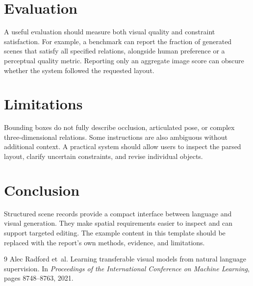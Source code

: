 \documentclass[10pt,a4paper,twoside]{article}
\makeatletter
\newcommand{\ReportAuthors}{First Author\textsuperscript{1,*}, Second Author\textsuperscript{1,2,\ensuremath{\dagger}}, Third Author\textsuperscript{2}}
\newcommand{\ReportLabName}{ReLER Lab}
\newcommand{\ReportInstitution}{\ReportLabName, Zhejiang University}
\newcommand{\ReportAuthorNotes}{\textsuperscript{*}Equal contribution \quad \textsuperscript{\ensuremath{\dagger}}Corresponding author}
\newcommand{\ReportContact}{Second Author at \href{mailto:author@example.edu}{author@example.edu}}
\newif\ifbackauthorlist
\makeatother
\begin{document}
\section{Evaluation}

A useful evaluation should measure both visual quality and constraint
satisfaction. For example, a benchmark can report the fraction of generated
scenes that satisfy all specified relations, alongside human preference or a
perceptual quality metric. Reporting only an aggregate image score can obscure
whether the system followed the requested layout.

\section{Limitations}

Bounding boxes do not fully describe occlusion, articulated pose, or complex
three-dimensional relations. Some instructions are also ambiguous without
additional context. A practical system should allow users to inspect the
parsed layout, clarify uncertain constraints, and revise individual objects.

\section{Conclusion}

Structured scene records provide a compact interface between language and
visual generation. They make spatial requirements easier to inspect and can
support targeted editing. The example content in this template should be
replaced with the report's own methods, evidence, and limitations.

\begin{thebibliography}{9}
  Alec Radford et~al.
  \newblock Learning transferable visual models from natural language supervision.
  \newblock In \emph{Proceedings of the International Conference on Machine
  Learning}, pages 8748--8763, 2021.
\end{thebibliography}

\ifbackauthorlist
\section*{Author List}
{\rmfamily\bfseries\ReportAuthors\par}
\vspace{3pt}
{\rmfamily\ReportInstitution\par}
\vspace{3pt}
{\rmfamily\itshape\small\ReportAuthorNotes\par}
\vspace{3pt}
{\rmfamily\small\textbf{Correspondence:} \ReportContact\par}
\fi
\end{document}
